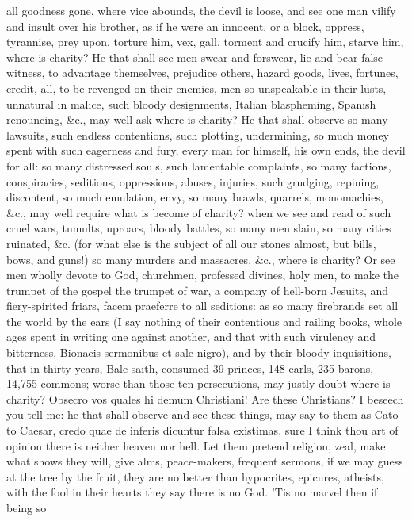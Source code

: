 {all goodness gone, where vice abounds, the devil is loose, and see one
man vilify and insult over his brother, as if he were an innocent, or a
block, oppress, tyrannise, prey upon, torture him, vex, gall, torment
and crucify him, starve him, where is charity? He that shall see men
swear and forswear, lie and bear false witness, to advantage
themselves, prejudice others, hazard goods, lives, fortunes, credit,
all, to be revenged on their enemies, men so unspeakable in their
lusts, unnatural in malice, such bloody designments, Italian
blaspheming, Spanish renouncing, \&c., may well ask where is charity? He
that shall observe so many lawsuits, such endless contentions, such
plotting, undermining, so much money spent with such eagerness and
fury, every man for himself, his own ends, the devil for all: so many
distressed souls, such lamentable complaints, so many factions,
conspiracies, seditions, oppressions, abuses, injuries, such grudging,
repining, discontent, so much emulation, envy, so many brawls,
quarrels, monomachies, \&c., may well require what is become of charity?
when we see and read of such cruel wars, tumults, uproars, bloody
battles, so many men slain, so many cities ruinated, \&c. (for
what else is the subject of all our stones almost, but bills, bows, and
guns!) so many murders and massacres, \&c., where is charity? Or see men
wholly devote to God, churchmen, professed divines, holy men, to
make the trumpet of the gospel the trumpet of war, a company of
hell-born Jesuits, and fiery-spirited friars, facem praeferre to all
seditions: as so many firebrands set all the world by the ears (I say
nothing of their contentious and railing books, whole ages spent in
writing one against another, and that with such virulency and
bitterness, Bionaeis sermonibus et sale nigro), and by their bloody
inquisitions, that in thirty years, Bale saith, consumed 39 princes,
148 earls, 235 barons, 14,755 commons; worse than those ten
persecutions, may justly doubt where is charity? Obsecro vos quales hi
demum Christiani! Are these Christians? I beseech you tell me: he that
shall observe and see these things, may say to them as Cato to Caesar,
credo quae de inferis dicuntur falsa existimas, sure I think thou art
of opinion there is neither heaven nor hell. Let them pretend religion,
zeal, make what shows they will, give alms, peace-makers, frequent
sermons, if we may guess at the tree by the fruit, they are no better
than hypocrites, epicures, atheists, with the fool in their
hearts they say there is no God. 'Tis no marvel then if being so
}
